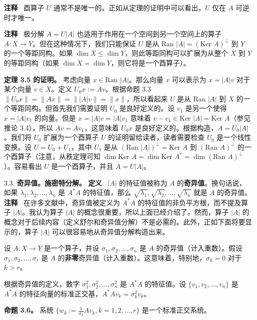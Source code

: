 \textbf{注释} ~酉算子 $U$ 通常不是唯一的。正如从定理的证明中可以看出，$U$ 仅在 $A$ 可逆时才唯一。

\textbf{注释} ~极分解 $A = U|A|$ 也适用于作用在一个空间到另一个空间上的算子 $A: X \to Y$。但在这种情况下，我们只能保证 $U$ 是从 $\text{Ran } |A| = (\text{Ker } A)^\perp$ 到 $Y$ 的一个等距同构。如果 $\dim X \leq \dim Y$，则此等距同构可以扩展为从整个 $X$ 到 $Y$ 的等距同构（如果 $\dim X = \dim Y$，则它将是一个酉算子）。

\textbf{定理 3.5 的证明。} 考虑向量 $x \in \text{Ran } |A|$。那么向量 $x$ 可以表示为 $x = |A|v$ 对于某个向量 $v \in X$。定义 $U_0 x := Av$。根据命题 3.3 $\|U_0 x\| = \|Ax\| = \||A|v\| = \|x\|$，所以看起来 $U$ 是从 $\text{Ran } |A|$ 到 $X$ 的一个等距同构。但首先我们需要证明 $U_0$ 是良好定义的。设 $v_1$ 是另一个使得 $x = |A|v_1$ 的向量。但是 $x = |A|v = |A|v_1$ 意味着 $v - v_1 \in \text{Ker } |A| = \text{Ker } A$（参见推论 3.4），所以 $Av = Av_1$，这意味着 $U_0 x$ 是良好定义的。根据构造，$A = U_0|A|$。我们将 $U_0$ 扩展为一个酉算子 $U$ 的证明留给读者，读者需要检查 $U_0$ 是一个线性变换。设 $U = U_0 + U_1$，其中 $U_1$ 是从 $(\text{Ran } |A|)^\perp = \text{Ker } A$ 到 $(\text{Ran } A)^\perp$ 的一个酉算子（注意，从秩定理可知 $\dim \text{Ker } A = \dim \text{Ker } A^* = \dim (\text{Ran } A)^\perp$）。容易看出 $U$ 是一个酉算子，并且 $A = U|A|$。

3.3. \textbf{奇异值。施密特分解。}
\textbf{定义}~ $|A|$ 的特征值被称为 $A$ 的\textbf{奇异值}。换句话说，如果 $\lambda_1, \lambda_2, \dots, \lambda_n$ 是 $A^*A$ 的特征值，那么 $\sqrt{\lambda_1}, \sqrt{\lambda_2}, \dots, \sqrt{\lambda_n}$ 就是 $A$ 的奇异值。
\textbf{注释} ~在许多文献中，奇异值被定义为 $A^*A$ 的特征值的非负平方根，而不提及算子 $|A|$。我认为算子 $|A|$ 的概念很重要，所以上面已经介绍了。然而，算子 $|A|$ 的概念对于后续内容（定义舒尔和奇异值分解）不是必需的。此外，正如下面将要显示的，算子 $|A|$ 可以很容易地从奇异值分解构造出来。

设 $A: X \to Y$ 是一个算子，并设 $\sigma_1, \sigma_2, \dots, \sigma_n$ 是 $A$ 的奇异值（计入重数）。假设 $\sigma_1, \sigma_2, \dots, \sigma_r$ 是 $A$ 的\textbf{非零}奇异值（计入重数）。这意味着，特别地，$\sigma_k = 0$ 对于 $k > r$。




根据奇异值的定义，数字 $\sigma_1^2, \sigma_2^2, \dots, \sigma_n^2$ 是 $A^*A$ 的特征值。设 $\{v_1, v_2, \dots, v_n\}$ 是 $A^*A$ 的特征向量的标准正交基，$A^*Av_k = \sigma_k^2 v_k$。

\textbf{命题 3.6。} 系统 $\{w_k := \frac{1}{\sigma_k} Av_k, k = 1, 2, \dots, r\}$ 是一个标准正交系统。

